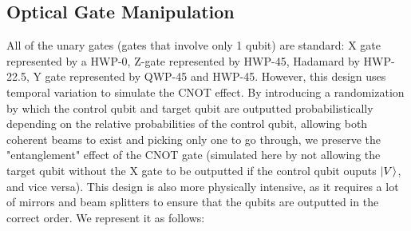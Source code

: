 \documentclass[12pt]{amsart}
\begin{document}
    \subsection{Optical Gate Manipulation}
    \label{subsec:Optical Gate Manipulation}
    All of the unary gates (gates that involve only 1 qubit) are standard: X gate represented by a HWP-0, Z-gate represented by HWP-45, Hadamard by HWP-22.5, Y gate represented by QWP-45 and HWP-45. However, this design uses temporal variation to simulate the CNOT effect. By introducing a randomization by which the control qubit and target qubit are outputted probabilistically depending on the relative probabilities of the control qubit, allowing both coherent beams to exist and picking only one to go through, we preserve the "entanglement" effect of the CNOT gate (simulated here by not allowing the target qubit without the X gate to be outputted if the control qubit ouputs $\ket{V}$, and vice versa). This design is also more physically intensive, as it requires a lot of mirrors and beam splitters to ensure that the qubits are outputted in the correct order. We represent it as follows:
\end{document}
